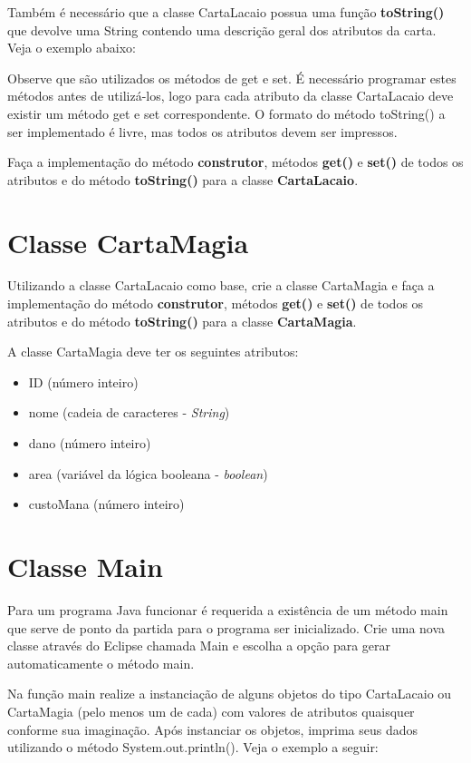 \documentclass[10pt]{article}
\begin{document}
Também é necessário que a classe CartaLacaio possua uma função \textbf{toString()} que devolve uma String contendo uma descrição geral dos atributos da carta. Veja o exemplo abaixo:



Observe que são utilizados os métodos de get e set. É necessário programar estes métodos antes de utilizá-los, logo para cada atributo da classe CartaLacaio deve existir um método get e set correspondente. O formato do método toString() a ser implementado é livre, mas todos os atributos devem ser impressos.

Faça a implementação do método \textbf{construtor}, métodos \textbf{get()} e \textbf{set()} de todos os atributos e do método \textbf{toString()} para a classe \textbf{CartaLacaio}.

\section{Classe CartaMagia}

Utilizando a classe CartaLacaio como base, crie a classe CartaMagia e faça a implementação do método \textbf{construtor}, métodos \textbf{get()} e \textbf{set()} de todos os atributos e do método \textbf{toString()} para a classe \textbf{CartaMagia}.

A classe CartaMagia deve ter os seguintes atributos:
\begin{itemize}
    \item ID (número inteiro)
    \item nome (cadeia de caracteres - \emph{String})
    \item dano (número inteiro)
    \item area (variável da lógica booleana - \emph{boolean})
    \item custoMana (número inteiro)
\end{itemize}

\section{Classe Main}

Para um programa Java funcionar é requerida a existência de um método main que serve de ponto da partida para o programa ser inicializado. Crie uma nova classe através do Eclipse chamada Main e escolha a opção para gerar automaticamente o método main.

Na função main realize a instanciação de alguns objetos do tipo CartaLacaio ou CartaMagia (pelo menos um de cada) com valores de atributos quaisquer conforme sua imaginação. Após instanciar os objetos, imprima seus dados utilizando o método System.out.println(). Veja o exemplo a seguir:
\end{document}
